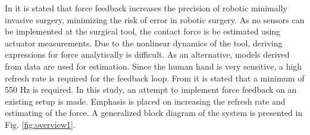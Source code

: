 




\vspace{5mm}

In \cite{RIGSP} it is stated that force feedback increases the precision of robotic minimally invasive surgery, minimizing the risk of error in robotic surgery.  As no sensors can be implemented at the surgical tool, the contact force is be estimated using actuator measurements. 
Due to the nonlinear dynamics of the tool, deriving expressions for force analytically is difficult.
As an alternative,  models derived from data are used for estimation.
Since the human hand is very sensitive, a high refresh rate is required for the feedback loop.
From \cite{coles2011role} it is stated that a minimum of 550 Hz is required. \newline
In this study, an attempt to implement force feedback on an existing setup is made. Emphasis is placed on increasing the refresh rate and estimating of the force. A generalized block diagram of the system is presented in Fig. \ref{fig:overview1}.

%

